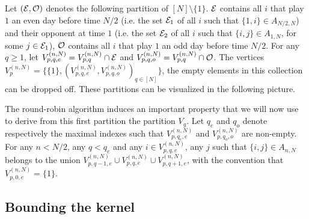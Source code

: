 Let $(\mathcal{E},\mathcal{O})$ denotes the following partition of $[N]\setminus\{1\}$. $\mathcal{E}$ contains all $i$ that play $1$ an even day before time $N/2$ (i.e. the set $\mathcal{E}_1$ of all $i$ such that $\{1,i\}\in A_{N/2,N}$) and their opponent at time $1$ (i.e. the set $\mathcal{E}_2$ of all $i$ such that $\{i,j\}\in A_{1,N}$, for some $j\in \mathcal{E}_1$), $\mathcal{O}$ contains all $i$ that play $1$ an odd day before time $N/2$. For any $q\ge 1$, let $V^{(n,N)}_{p,q,e}=V^{(n,N)}_{p,q}\cap \mathcal{E}$ and $V^{(n,N)}_{p,q,o}=V^{(n,N)}_{p,q}\cap \mathcal{O}$. The vertices $V_p^{(n,N)}=\{\{1\},(V^{(n,N)}_{p,q,e},V^{(n,N)}_{p,q,o})_{q\in[N]}\}$, the empty elements in this collection can be dropped off. These partitions can be visualized in the following picture.

 

The round-robin algorithm induces an important property that we will now use to derive from this first partition the partition $V_g$. Let $q_e$ and $q_o$ denote respectively the maximal indexes such that $V^{(n,N)}_{p,q_e,e}$ and $V^{(n,N)}_{p,q_o,o}$  are non-empty. For any $n<N/2$, any $q<q_e$ and any $i\in V^{(n,N)}_{p,q,e}$, any $j$ such that $\{i,j\}\in A_{n,N}$ belongs to the union $V^{(n,N)}_{p,q-1,e}\cup V^{(n,N)}_{p,q,e}\cup V^{(n,N)}_{p,q+1,e}$, with the convention that $V^{(n,N)}_{p,0,e}=\{1\}$.

\subsection{Bounding the kernel}

